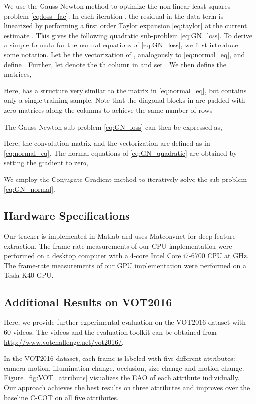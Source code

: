 \documentclass[10pt,twocolumn,letterpaper]{article}
\begin{document}
We use the Gauss-Newton method \cite{NumericalOptimization} to optimize the non-linear least squares problem \eqref{eq:loss_fac}. In each iteration , the residual in the data-term is linearized by performing a first order Taylor expansion \eqref{eq:taylor} at the current estimate . This gives the following quadratic sub-problem \eqref{eq:GN_loss}.
To derive a simple formula for the normal equations of \eqref{eq:GN_loss}, we first introduce some notation. Let  be the vectorization of , analogously to \eqref{eq:normal_eq}, and define . Further, let  denote the th column in  and set . We then define the matrices,

Here,  has a structure very similar to the matrix  in \eqref{eq:normal_eq}, but contains only a single training sample. Note that the diagonal blocks in  are padded with zero matrices  along the columns to achieve the same number of  rows.

The Gauss-Newton sub-problem \eqref{eq:GN_loss} can then be expressed as,

Here, the convolution matrix  and the vectorization  are defined as in \eqref{eq:normal_eq}. The normal equations of \eqref{eq:GN_quadratic} are obtained by setting the gradient to zero,

We employ the Conjugate Gradient method to iteratively solve the sub-problem \eqref{eq:GN_normal}.

\subsection*{Hardware Specifications}
\label{sec:supp_hw}

Our tracker is implemented in Matlab and uses Matconvnet \cite{matconvnet} for deep feature extraction. The frame-rate measurements of our CPU implementation were performed on a desktop computer with a 4-core Intel Core i7-6700 CPU at  GHz. The frame-rate measurements of our GPU implementation were performed on a Tesla K40 GPU.

\subsection*{Additional Results on VOT2016}
\label{sec:supp_VOT}
Here, we provide further experimental evaluation on the VOT2016 dataset \cite{VOT2016} with 60 videos. The videos and the evaluation toolkit can be obtained from \url{http://www.votchallenge.net/vot2016/}.

In the VOT2016 dataset, each frame is labeled with five different attributes: camera motion, illumination change, occlusion, size change and motion change. Figure~\ref{fig:VOT_attribute} visualizes the EAO of each attribute individually. Our approach achieves the best results on three attributes and improves over the baseline C-COT \cite{DanelljanECCV2016} on all five attributes.
\end{document}
